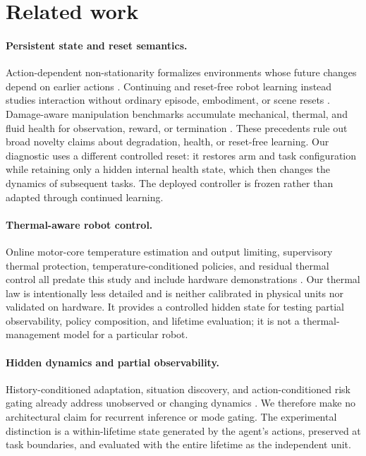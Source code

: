 \section{Related work}
\label{sec:related}

\paragraph{Persistent state and reset semantics.}
Action-dependent non-stationarity formalizes environments whose future changes
depend on earlier actions \citep{chandak2022nonstationary}. Continuing and
reset-free robot learning instead studies interaction without ordinary episode,
embodiment, or scene resets \citep{farrahi2025continuing,wu2026cronos}.
Damage-aware manipulation benchmarks accumulate mechanical, thermal, and fluid
health for observation, reward, or termination \citep{balaji2026oopsieverse}.
These precedents rule out broad novelty claims about degradation, health, or
reset-free learning. Our diagnostic uses a different controlled reset: it
restores arm and task configuration while retaining only a hidden internal
health state, which then changes the dynamics of subsequent tasks. The deployed
controller is frozen rather than adapted through continued learning.

\paragraph{Thermal-aware robot control.}
Online motor-core temperature estimation and output limiting, supervisory
thermal protection, temperature-conditioned policies, and residual thermal
control all predate this study and include hardware demonstrations
\citep{kawaharazuka2020thermal,sabelhaus2024supervisory,qian2026thermal,wan2026residual}.
Our thermal law is intentionally less detailed and is neither calibrated in
physical units nor validated on hardware. It provides a controlled hidden state
for testing partial observability, policy composition, and lifetime evaluation;
it is not a thermal-management model for a particular robot.

\paragraph{Hidden dynamics and partial observability.}
History-conditioned adaptation, situation discovery, and action-conditioned
risk gating already address unobserved or changing dynamics
\citep{murillo2026situational,kwon2026adaptive,liu2026riskgating}. We therefore
make no architectural claim for recurrent inference or mode gating. The
experimental distinction is a within-lifetime state generated by the agent's
actions, preserved at task boundaries, and evaluated with the entire lifetime
as the independent unit.

